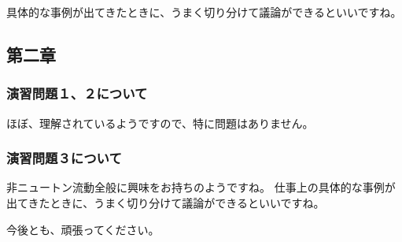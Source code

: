 \documentclass[uplatex,dvipdfmx,a4paper,11pt]{jsreport}
\begin{document}
具体的な事例が出てきたときに、うまく切り分けて議論ができるといいですね。


\subsection*{第二章}
\subsubsection*{演習問題１、２について}
ほぼ、理解されているようですので、特に問題はありません。

\subsubsection*{演習問題３について}


非ニュートン流動全般に興味をお持ちのようですね。
仕事上の具体的な事例が出てきたときに、うまく切り分けて議論ができるといいですね。

今後とも、頑張ってください。

\clearpage
\end{document}
